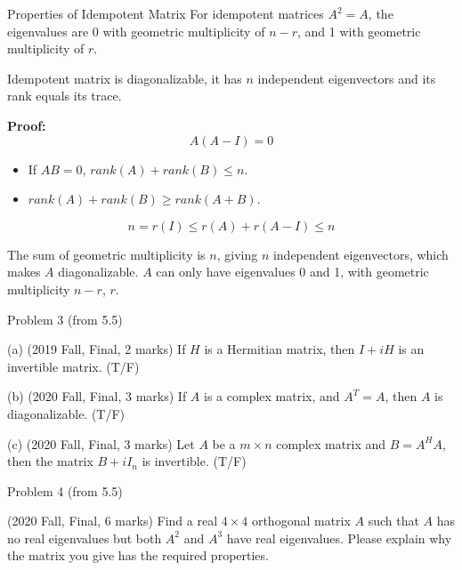 \documentclass{beamer}
\begin{document}
\begin{frame}{Properties of Idempotent Matrix}
    For idempotent matrices $A^2=A$, the eigenvalues are 0 with geometric multiplicity of $n-r$, and 1 with geometric multiplicity of $r$.
    
    \vspace{3pt}
    Idempotent matrix is diagonalizable, it has $n$ independent eigenvectors and its rank equals its trace.
    
    \vspace{5pt}
    
    \textbf{Proof:}
    \begin{equation*}
        A\left( A-I \right) =0
    \end{equation*}
    
    \begin{itemize}
        \item If $AB=0$, $rank(A)+rank(B)\leq n$.
        \item $rank(A)+rank(B)\geq  rank(A+B)$.
    \end{itemize}
    
    \begin{equation*}
        n=r\left( I \right) \leqslant r\left( A \right) +r\left( A-I \right) \leqslant n
    \end{equation*}
    
    The sum of geometric multiplicity is $n$, giving $n$ independent eigenvectors, which makes $A$ diagonalizable. $A$ can only have eigenvalues 0 and 1, with geometric multiplicity $n-r$, $r$.
    \end{frame}

\begin{frame}{Problem 3 (from 5.5)}
\begin{example}

    (a) (2019 Fall, Final, 2 marks) If $H$ is a Hermitian matrix, then $I+iH$ is an invertible matrix. (T/F)

    \vspace{3pt}
    (b) (2020 Fall, Final, 3 marks) If $A$ is a complex matrix, and $A^T=A$, then $A$ is diagonalizable. (T/F)

    \vspace{3pt}
    (c) (2020 Fall, Final, 3 marks) Let $A$ be a $m\times n$ complex matrix and $B=A^HA$, then the matrix $B+iI_n$ is invertible. (T/F)
\end{example}
\end{frame}

\begin{frame}{Problem 4 (from 5.5)}
\begin{example}
    (2020 Fall, Final, 6 marks) Find a real $4\times 4$ orthogonal matrix $A$ such that $A$ has no real eigenvalues but both $A^2$ and $A^3$ have real eigenvalues. Please explain why the matrix you give has the required properties.
\end{example}
\end{frame}
\end{document}
